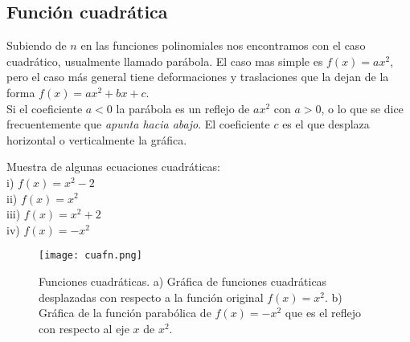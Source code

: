 \subsection{Función cuadrática}
Subiendo de $n$ en las funciones polinomiales nos encontramos con el caso cuadrático, usualmente llamado parábola. El caso mas simple es $f(x)=ax^{2}$, pero el caso más general tiene deformaciones y traslaciones que la dejan de la forma $f(x)=ax^{2}+bx+c$.\\
Si el coeficiente $a<0$ la parábola es un reflejo de $ax^{2}$ con $a>0$, o lo que se dice frecuentemente que \textit{apunta hacia abajo}. El coeficiente $c$ es el que desplaza horizontal o verticalmente la gráfica.
\begin{myexample}
Muestra de algunas ecuaciones cuadráticas:\\

\noindent i) $f(x)= x^{2}-2$ \\
\noindent ii) $f(x)=x^{2} $\\
\noindent iii) $f(x)= x^{2}+2 $\\
\noindent iv) $f(x)= -x^{2}$ \\

\begin{center}
\begin{figure}[h!]
\centering
\texttt{[image: cuafn.png]}
\caption[Funciones cuadraticas.]{Funciones cuadráticas. a) Gráfica de funciones cuadráticas desplazadas con respecto a la función original $f(x)=x^{2}$. b) Gráfica de la función parabólica de $f(x)=-x^{2}$ que es el reflejo con respecto al eje $x$ de $x^{2}$. } \label{cuadfn}
\end{figure}
\end{center}
\end{myexample}


